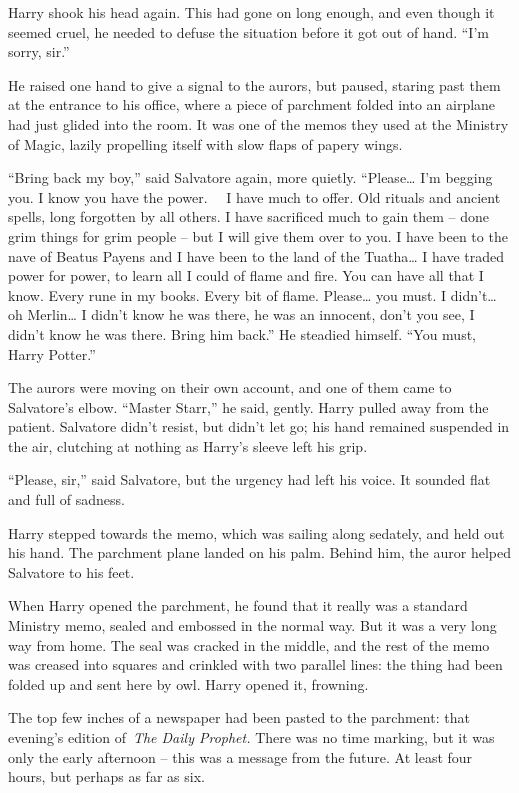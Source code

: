 Harry shook his head again. This had gone on long enough, and even
though it seemed cruel, he needed to defuse the situation before it got
out of hand. ``I'm sorry, sir.''

He raised one hand to give a signal to the aurors, but paused, staring
past them at the entrance to his office, where a piece of parchment
folded into an airplane had just glided into the room. It was one of the
memos they used at the Ministry of Magic, lazily propelling itself with
slow flaps of papery wings.

``Bring back my boy,'' said Salvatore again, more quietly.
``Please\ldots{} I'm begging you. I know you have the power. ~~I have
much to offer. Old rituals and ancient spells, long forgotten by all
others. I have sacrificed much to gain them -- done grim things for grim
people -- but I will give them over to you. I have been to the nave of
Beatus Payens and I have been to the land of the Tuatha\ldots{} I have
traded power for power, to learn all I could of flame and fire. You can
have all that I know. Every rune in my books. Every bit of flame.
Please\ldots{} you must. I didn't\ldots{} oh Merlin\ldots{} I didn't
know he was there, he was an innocent, don't you see, I didn't know he
was there. Bring him back.'' He steadied himself. ``You must, Harry
Potter.''

The aurors were moving on their own account, and one of them came to
Salvatore's elbow. ``Master Starr,'' he said, gently. Harry pulled away
from the patient. Salvatore didn't resist, but didn't let go; his hand
remained suspended in the air, clutching at nothing as Harry's sleeve
left his grip.

``Please, sir,'' said Salvatore, but the urgency had left his voice. It
sounded flat and full of sadness.

Harry stepped towards the memo, which was sailing along sedately, and
held out his hand. The parchment plane landed on his palm. Behind him,
the auror helped Salvatore to his feet.

When Harry opened the parchment, he found that it really was a standard
Ministry memo, sealed and embossed in the normal way. But it was a very
long way from home. The seal was cracked in the middle, and the rest of
the memo was creased into squares and crinkled with two parallel lines:
the thing had been folded up and sent here by owl. Harry opened it,
frowning.

The top few inches of a newspaper had been pasted to the parchment: that
evening's edition of~\emph{The Daily Prophet.} There was no time
marking, but it was only the early afternoon -- this was a message from
the future. At least four hours, but perhaps as far as six.

